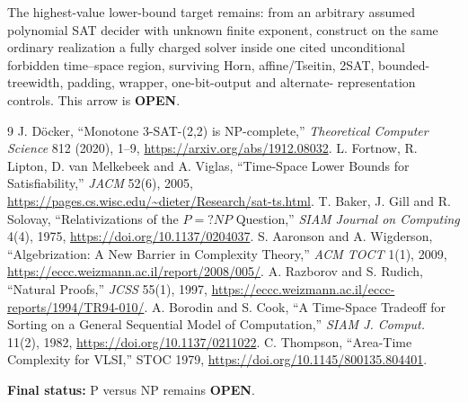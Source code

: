 \documentclass[11pt]{article}
\newcommand{\OPEN}{\textbf{OPEN}}
\begin{document}
The highest-value lower-bound target remains: from an arbitrary assumed
polynomial SAT decider with unknown finite exponent, construct on the same
ordinary realization a fully charged solver inside one cited unconditional
forbidden time--space region, surviving Horn, affine/Tseitin, 2SAT,
bounded-treewidth, padding, wrapper, one-bit-output and alternate-
representation controls.  This arrow is \OPEN.

\begin{thebibliography}{9}
 J. D\"ocker, ``Monotone 3-SAT-(2,2) is NP-complete,''
\emph{Theoretical Computer Science} 812 (2020), 1--9,
\url{https://arxiv.org/abs/1912.08032}.
 L. Fortnow, R. Lipton, D. van Melkebeek and A. Viglas,
``Time-Space Lower Bounds for Satisfiability,'' \emph{JACM} 52(6), 2005,
\url{https://pages.cs.wisc.edu/~dieter/Research/sat-ts.html}.
 T. Baker, J. Gill and R. Solovay, ``Relativizations of the
$P=?NP$ Question,'' \emph{SIAM Journal on Computing} 4(4), 1975,
\url{https://doi.org/10.1137/0204037}.
 S. Aaronson and A. Wigderson, ``Algebrization: A New Barrier
in Complexity Theory,'' \emph{ACM TOCT} 1(1), 2009,
\url{https://eccc.weizmann.ac.il/report/2008/005/}.
 A. Razborov and S. Rudich, ``Natural Proofs,'' \emph{JCSS}
55(1), 1997, \url{https://eccc.weizmann.ac.il/eccc-reports/1994/TR94-010/}.
 A. Borodin and S. Cook, ``A Time-Space Tradeoff for Sorting on
a General Sequential Model of Computation,'' \emph{SIAM J. Comput.} 11(2),
1982, \url{https://doi.org/10.1137/0211022}.
 C. Thompson, ``Area-Time Complexity for VLSI,'' STOC 1979,
\url{https://doi.org/10.1145/800135.804401}.
\end{thebibliography}

\noindent\textbf{Final status:} P versus NP remains \OPEN.

\end{document}
